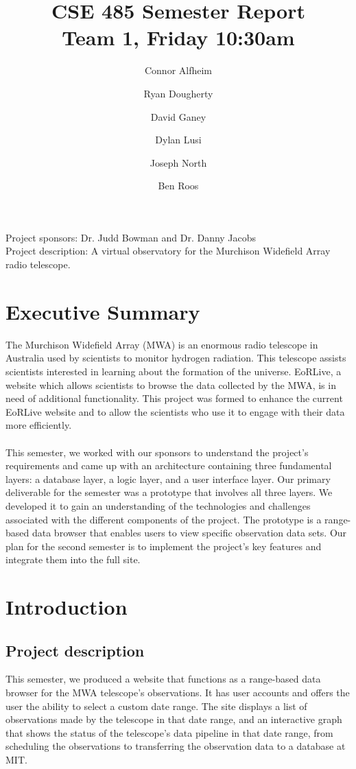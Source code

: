 \documentclass[12pt]{article}
\begin{document}
\begin{spacing}{.4}
\setlength{\droptitle}{-7em}
\title{CSE 485 Semester Report \\  Team 1, Friday 10:30am}
\author{Connor Alfheim \and Ryan Dougherty \and David Ganey \and Dylan Lusi \and Joseph North \and Ben Roos}
\maketitle
\end{spacing}

\begin{spacing}{1.5}
\noindent
Project sponsors: Dr. Judd Bowman and Dr. Danny Jacobs \\
Project description: A virtual observatory for the Murchison Widefield Array radio telescope.
\newpage

\tableofcontents
\newpage

\section{Executive Summary}
The Murchison Widefield Array (MWA) is an enormous radio telescope in Australia used by scientists to monitor hydrogen radiation. This telescope assists scientists interested in learning about the formation of the universe. EoRLive, a website which allows scientists to browse the data collected by the MWA, is in need of additional functionality. This project was formed to enhance the current EoRLive website and to allow the scientists who use it to engage with their data more efficiently.
\\ \\
This semester, we worked with our sponsors to understand the project's requirements and came up with an architecture containing three fundamental layers: a database layer, a logic layer, and a user interface layer. Our primary deliverable for the semester was a prototype that involves all three layers. We developed it to gain an understanding of the technologies and challenges associated with the different components of the project. The prototype is a range-based data browser that enables users to view specific observation data sets. Our plan for the second semester is to implement the project's key features and integrate them into the full site.

\section{Introduction}
\subsection{Project description}
This semester, we produced a website that functions as a range-based data browser for the MWA telescope's observations. It has user accounts and offers the user the ability to select a custom date range. The site displays a list of observations made by the telescope in that date range, and an interactive graph that shows the status of the telescope's data pipeline in that date range, from scheduling the observations to transferring the observation data to a database at MIT.

\end{spacing}
\end{document}

